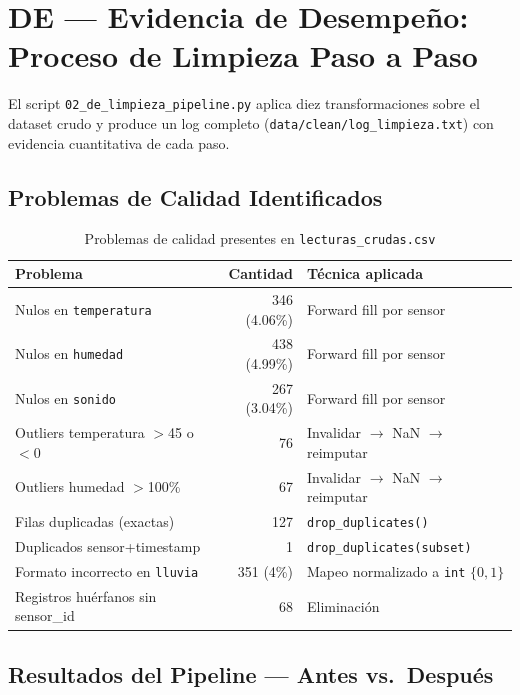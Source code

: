 \section{DE --- Evidencia de Desempe\~no: Proceso de Limpieza Paso a Paso}

El script \texttt{02\_de\_limpieza\_pipeline.py} aplica diez transformaciones sobre el
dataset crudo y produce un log completo (\texttt{data/clean/log\_limpieza.txt}) con
evidencia cuantitativa de cada paso.

\subsection{Problemas de Calidad Identificados}

\begin{table}[h!]
  \centering
  \caption{Problemas de calidad presentes en \texttt{lecturas\_crudas.csv}}
  \begin{tabularx}{\textwidth}{lrX}
    \toprule
    \textbf{Problema} & \textbf{Cantidad} & \textbf{T\'ecnica aplicada} \\
    \midrule
    Nulos en \texttt{temperatura}          & 346 (4.06\%)   & Forward fill por sensor \\
    Nulos en \texttt{humedad}              & 438 (4.99\%)   & Forward fill por sensor \\
    Nulos en \texttt{sonido}               & 267 (3.04\%)   & Forward fill por sensor \\
    Outliers temperatura $>$45\textcelsius{} o $<$0\textcelsius{} & 76 & Invalidar $\rightarrow$ NaN $\rightarrow$ reimputar \\
    Outliers humedad $>$100\%              & 67             & Invalidar $\rightarrow$ NaN $\rightarrow$ reimputar \\
    Filas duplicadas (exactas)             & 127            & \texttt{drop\_duplicates()} \\
    Duplicados sensor+timestamp            & 1              & \texttt{drop\_duplicates(subset)} \\
    Formato incorrecto en \texttt{lluvia}  & 351 (4\%)      & Mapeo normalizado a \texttt{int} $\{0,1\}$ \\
    Registros hu\'erfanos sin sensor\_id   & 68             & Eliminaci\'on \\
    \bottomrule
  \end{tabularx}
\end{table}

\subsection{Resultados del Pipeline --- Antes vs.\ Despu\'es}

